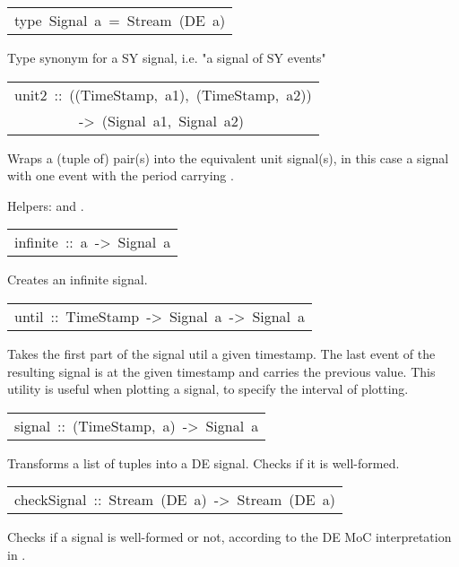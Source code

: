 \begin{haddockdesc}
\item[\begin{tabular}{@{}l}
type\ Signal\ a\ =\ Stream\ (DE\ a)
\end{tabular}]\haddockbegindoc
Type synonym for a SY signal, i.e. "a signal of SY events"\par


\item[\begin{tabular}{@{}l}
unit2\ ::\ ((TimeStamp,\ a1),\ (TimeStamp,\ a2))\\\ \ \ \ \ \ \ \ \ ->\ (Signal\ a1,\ Signal\ a2)
\end{tabular}]\haddockbegindoc
Wraps a (tuple of) pair(s)  into the equivalent
 unit signal(s), in this case a signal with one event with the
 period  carrying .\par
Helpers:  and .\par


\item[\begin{tabular}{@{}l}
infinite\ ::\ a\ ->\ Signal\ a
\end{tabular}]\haddockbegindoc
Creates an infinite signal.\par


\item[\begin{tabular}{@{}l}
until\ ::\ TimeStamp\ ->\ Signal\ a\ ->\ Signal\ a
\end{tabular}]\haddockbegindoc
Takes the first part of the signal util a given timestamp. The
 last event of the resulting signal is at the given timestamp and
 carries the previous value. This utility is useful when plotting
 a signal, to specify the interval of plotting.\par


\item[\begin{tabular}{@{}l}
signal\ ::\ {\char 91}(TimeStamp,\ a){\char 93}\ ->\ Signal\ a
\end{tabular}]\haddockbegindoc
Transforms a list of tuples  into a DE
 signal. Checks if it is well-formed.\par


\item[\begin{tabular}{@{}l}
checkSignal\ ::\ Stream\ (DE\ a)\ ->\ Stream\ (DE\ a)
\end{tabular}]\haddockbegindoc
Checks if a signal is well-formed or not, according to the DE MoC
 interpretation in .\par



\end{haddockdesc}
